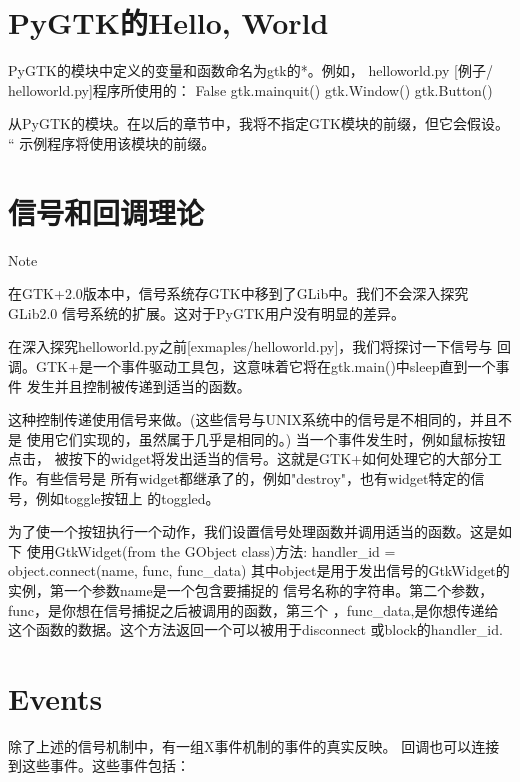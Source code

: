 	\section{PyGTK的Hello, World}

PyGTK的模块中定义的变量和函数命名为gtk的*。例如，
helloworld.py [例子/ helloworld.py]程序所使用的：
False
gtk.mainquit()
gtk.Window()
gtk.Button()


从PyGTK的模块。在以后的章节中，我将不指定GTK模块的前缀，但它会假设。 “
示例程序将使用该模块的前缀。


	\section{信号和回调理论}
Note

在GTK+2.0版本中，信号系统存GTK中移到了GLib中。我们不会深入探究GLib2.0
信号系统的扩展。这对于PyGTK用户没有明显的差异。


在深入探究helloworld.py之前[exmaples/helloworld.py]，我们将探讨一下信号与
回调。GTK+是一个事件驱动工具包，这意味着它将在gtk.main()中sleep直到一个事件
发生并且控制被传递到适当的函数。


这种控制传递使用信号来做。(这些信号与UNIX系统中的信号是不相同的，并且不是
使用它们实现的，虽然属于几乎是相同的。) 当一个事件发生时，例如鼠标按钮点击，
被按下的widget将发出适当的信号。这就是GTK+如何处理它的大部分工作。有些信号是
所有widget都继承了的，例如"destroy"，也有widget特定的信号，例如toggle按钮上
的toggled。


为了使一个按钮执行一个动作，我们设置信号处理函数并调用适当的函数。这是如下
使用GtkWidget(from the GObject class)方法:
handler\_id = object.connect(name, func, func\_data)
其中object是用于发出信号的GtkWidget的实例，第一个参数name是一个包含要捕捉的
信号名称的字符串。第二个参数，func，是你想在信号捕捉之后被调用的函数，第三个
，func\_data,是你想传递给这个函数的数据。这个方法返回一个可以被用于disconnect
或block的handler\_id.

\section{Events}
除了上述的信号机制中，有一组X事件机制的事件的真实反映。
回调也可以连接到这些事件。这些事件包括：


